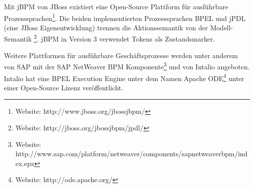 Mit jBPM von JBoss existiert eine Open-Source Plattform für ausführbare Prozesssprachen\footnote
{Website: http://www.jboss.org/jbossjbpm/}.
Die beiden implementierten Prozesssprachen BPEL und jPDL (eine JBoss Eigenentwicklung) trennen die Aktionssemantik von der Modell-Semantik \footnote
{Website: http://jboss.org/jbossjbpm/jpdl/}.
jBPM in Version 3 verwendet Tokens als Zustandsmarker.

Weitere Plattformen für ausführbare Geschäftsprozesse werden unter anderem von SAP mit der SAP NetWeaver BPM Komponente\footnote
{Website: http://www.sap.com/platform/netweaver/components/sapnetweaverbpm/index.epx} und von Intalio angeboten. Intalio hat eine BPEL Execution Engine unter dem Namen Apache ODE\footnote
{Website: http://ode.apache.org/} unter einer Open-Source Lizenz veröffentlicht.



